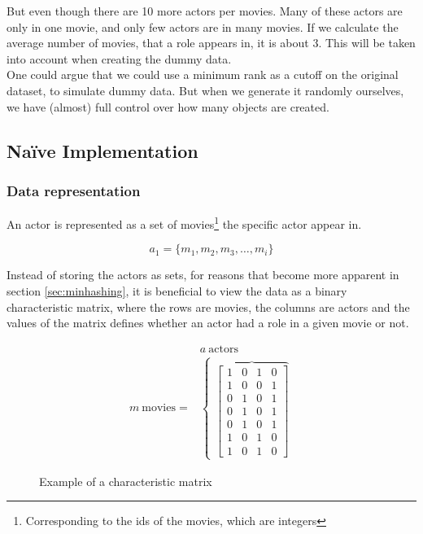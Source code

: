 \documentclass[a4paper,11pt]{article}
\begin{document}
But even though there are 10 more actors per movies. Many of these actors are only in one movie, and only few actors are in many movies. If we calculate the average number of movies, that a role appears in, it is about 3. This will be taken into account when creating the dummy data. \\

One could argue that we could use a minimum rank as a cutoff on the original dataset, to simulate dummy data. But when we generate it randomly ourselves, we have (almost) full control over how many objects are created. \\


\subsection{Naïve Implementation}


\subsubsection{Data representation}
An actor is represented as a set of movies\footnote{Corresponding to the ids of the movies, which are integers} the specific actor appear in.

\begin{equation}
a_1 = \{m_1, m_2, m_3, \ldots , m_i\}
\end{equation}

Instead of storing the actors as sets, for reasons that become more apparent in section \ref{sec:minhashing}, it is beneficial to view the data as a binary characteristic matrix, where the rows are movies, the columns are actors and the values of the matrix defines whether an actor had a role in a given movie or not.\\ 

\begin{figure}[!htbp]
\begin{eqnarray*}
 & a \ \text{actors} \\
 m \ \text{movies} = & 
\begin{cases}
    \overbrace{
    \begin{bmatrix}
        1 & 0 & 1 & 0 \\
        1 & 0 & 0 & 1 \\
        0 & 1 & 0 & 1 \\
        0 & 1 & 0 & 1 \\
        0 & 1 & 0 & 1 \\
        1 & 0 & 1 & 0 \\
        1 & 0 & 1 & 0
    \end{bmatrix} 
    }
\end{cases}
\end{eqnarray*}
\caption{Example of a characteristic matrix}
\label{fig:char_matrix}
\end{figure}
\end{document}
